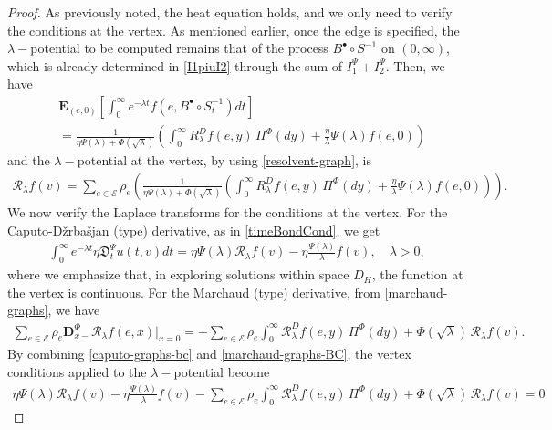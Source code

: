 \documentclass[10pt,a4paper]{amsart}
\begin{document}
\begin{proof}
			
			As previously noted, the heat equation holds, and we only need to verify the conditions at the vertex. 
			As mentioned earlier, once the edge is specified, the $\lambda-$potential to be computed remains that of the process $B^\bullet\circ {S}^{-1}$ on $(0,\infty)$, which is already determined in \eqref{I1piuI2} through the sum of $I_1^\Psi+ I_2^\Psi$. Then, we have
			\begin{align*}
				&\mathbf{E}_{(e,0)}  \left[\int_0^\infty e^{-\lambda t} f(e, B^\bullet\circ {S}^{-1}_t) dt\right]\\&=\frac{1}{\eta \Psi(\lambda) +\Phi(\sqrt \lambda)} \left( \int_0^\infty R_\lambda^D f(e,y) \, \Pi^\Phi(dy) + \frac{\eta}{\lambda} \Psi(\lambda)f(e,0) \right)
			\end{align*}
			and the $\lambda-$potential at the vertex, by using \eqref{resolvent-graph}, is
			\begin{align*}
				\mathcal{R}_\lambda f(v)= \sum_{e\in \mathcal{E}} \rho_e \left(\frac{1}{\eta \Psi(\lambda) +\Phi(\sqrt \lambda)} \left( \int_0^\infty R_\lambda^D f(e,y) \, \Pi^\Phi(dy) + \frac{\eta}{\lambda} \Psi(\lambda)f(e,0) \right)\right).
			\end{align*}
			We now verify the Laplace transforms for the conditions at the vertex. For the Caputo-D\v{z}rba\v{s}jan (type) derivative, as in \eqref{timeBondCond}, we get
			\begin{align}
				\label{caputo-graphs-bc}
				\int_0^\infty e^{-\lambda t} \eta\mathfrak{D}_t^\Psi u(t,v) dt = \eta \Psi(\lambda) \mathcal{R}_\lambda f(v) - \eta \frac{\Psi(\lambda)}{\lambda} f(v), \quad \lambda>0,
			\end{align}
			where we emphasize that, in exploring solutions within space $D_H$, the function at the vertex is continuous. For the Marchaud (type) derivative, from \eqref{marchaud-graphs}, we have
			\begin{align}
				\label{marchaud-graphs-BC}
				\sum_{e \in \mathcal{E}} \rho_e \mathbf{D}_{x-}^\Phi \mathcal{R}_\lambda f(e,x)\big\vert_{x=0} =-\sum_{e \in \mathcal{E}} \rho_e \int_0^\infty \mathcal{R}_\lambda^D f(e,y)\, \Pi^\Phi(dy) + \Phi(\sqrt{\lambda})\, \mathcal{R}_\lambda f(v).
			\end{align}
			By combining \eqref{caputo-graphs-bc} and \eqref{marchaud-graphs-BC}, the vertex conditions applied to the $\lambda-$potential become
			\begin{align*}
				\eta \Psi(\lambda) \mathcal{R}_\lambda f(v) - \eta \frac{\Psi(\lambda)}{\lambda} f(v) - \sum_{e \in \mathcal{E}} \rho_e \int_0^\infty \mathcal{R}_\lambda^D f(e,y)\, \Pi^\Phi(dy) + \Phi(\sqrt{\lambda})\, \mathcal{R}_\lambda f(v)=0

\end{align*}
\end{proof}
\end{document}
